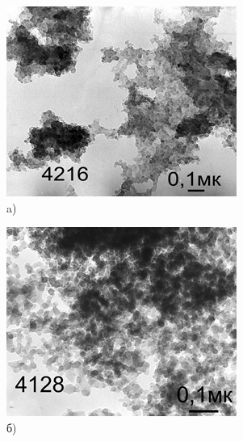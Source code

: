\begin{figure}[H]
    \centering
    \begin{subfigure}[b]{0.32\textwidth}
        \centering
        \includegraphics[width=\textwidth]{assets/29}
        \caption*{a)}
    \end{subfigure}
    \hfill
    \begin{subfigure}[b]{0.32\textwidth}
        \centering
        \includegraphics[width=\textwidth]{assets/30}
        \caption*{б)}
    \end{subfigure}
    \hfill
    \begin{subfigure}[b]{0.32\textwidth}

\end{subfigure}
\end{figure}
